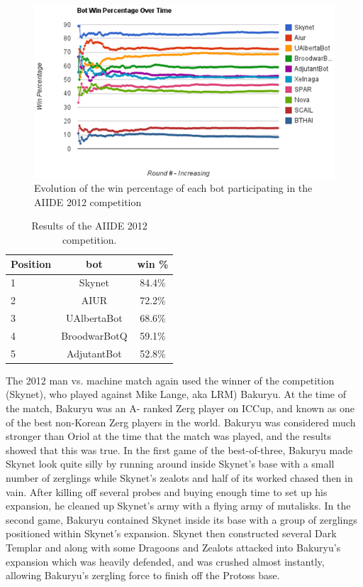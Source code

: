 \documentclass[journal]{IEEEtran}
\begin{document}
\begin{figure}
    \centering
    \includegraphics[width=\columnwidth]{figures/aiide2012.png}
    \caption{Evolution of the win percentage of each bot participating in the AIIDE 2012 competition}
    \label{fig:aiide2012}
\end{figure}


\begin{table}[bth]
\caption{Results of the AIIDE 2012 competition.}
\label{tab:aiide2012}
\begin{small}
\begin{center}
\begin{tabular}{|l|c|c|}
\hline
Position & bot & win \% \\ \hline
1 & Skynet & 84.4\% \\
2 & AIUR & 72.2\% \\
3 & UAlbertaBot & 68.6\% \\
4 & BroodwarBotQ & 59.1\% \\
5 & AdjutantBot & 52.8\% \\ \hline
\end{tabular}
\end{center}
\end{small}
\end{table}

The 2012 man vs. machine match again used the winner of the competition (Skynet), who played against
Mike Lange, aka LRM) Bakuryu. At the time of the match, Bakuryu was an A- ranked Zerg player on ICCup,
and known as one of the best non-Korean Zerg players in the world. Bakuryu was considered much
stronger than Oriol at the time that the match was played, and the results showed that this was true.
In the first game of the best-of-three, Bakuryu made Skynet look quite silly by running around inside
Skynet's base with a small number of zerglings while Skynet's zealots and half of its worked chased
then in vain. After killing off several probes and buying enough time to set up his expansion, he
cleaned up Skynet's army with a flying army of mutalisks. In the second game, Bakuryu contained Skynet
inside its base with a group of zerglings positioned within Skynet's expansion. Skynet then constructed
several Dark Templar and along with some Dragoons and Zealots attacked into Bakuryu's expansion which
was heavily defended, and was crushed almost instantly, allowing Bakuryu's zergling force to finish
off the Protoss base. 
\end{document}
